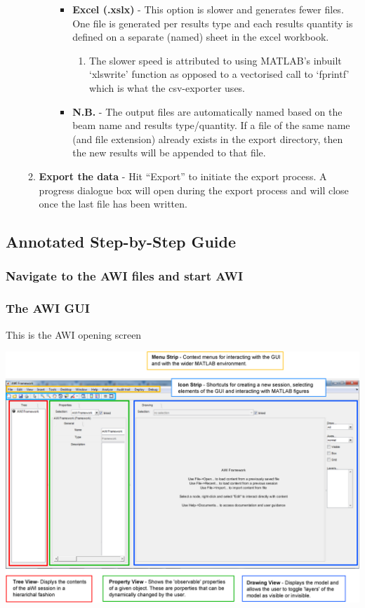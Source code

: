 \begin{enumerate}
\begin{enumerate}
\begin{enumerate}
\begin{itemize}
				\item \textbf{Excel (.xslx)} - This option is slower and generates fewer files. One file is generated per results type and each results quantity is defined on a separate (named) sheet in the excel workbook. 
				\begin{enumerate}
					\item The slower speed is attributed to using MATLAB’s inbuilt `xlswrite' function as opposed to a vectorised call to `fprintf' which is what the csv-exporter uses.
				\end{enumerate}
				\item \textbf{N.B.} - The output files are automatically named based on the beam name and results type/quantity. If a file of the same name (and file extension) already exists in the export directory, then the new results will be appended to that file.
			\end{itemize}
		\end{enumerate}
		\item \textbf{Export the data} - Hit ``Export'' to initiate the export process. A progress dialogue box will open during the export process and will close once the last file has been written. 
	\end{enumerate}
\end{enumerate}
\subsection*{Annotated Step-by-Step Guide}

\newpage
\begin{landscape}
\subsubsection{Navigate to the AWI files and start AWI}
\end{landscape}

\newpage
\begin{landscape}
\subsubsection{The AWI GUI}
This is the AWI opening screen

\includegraphics[width=1.3\textwidth]{AWIGUI.eps}
\end{landscape}

